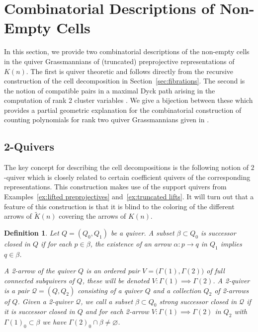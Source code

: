 \documentclass{amsart}
\newtheorem{definition}[theorem]{Definition}
\numberwithin{equation}{section}
\newcommand{\cQ}{\mathcal{Q}}
\begin{document}
\section{Combinatorial Descriptions of Non-Empty Cells}
\label{sec:combinatorics}
\noindent In this section, we provide two combinatorial descriptions of the non-empty cells in the quiver Grassmannians of (truncated) preprojective representations of $K(n)$.
The first is quiver theoretic and follows directly from the recursive construction of the cell decomposition in Section~\ref{sec:fibrations}.
The second is the notion of compatible pairs in a maximal Dyck path arising in the computation of rank 2 cluster variables \cite{llz}.
We give a bijection between these which provides a partial geometric explanation for the combinatorial construction of counting polynomials for rank two quiver Grassmannians given in \cite{rupel}.

\subsection{2-Quivers}\label{sec:2quivers}

The key concept for describing the cell decompositions is the following notion of $2$-quiver which is closely related to certain coefficient quivers of the corresponding representations.
This construction makes use of the support quivers from Examples~\ref{ex:lifted preprojectives} and~\ref{ex:truncated lifts}.
It will turn out that a feature of this construction is that it is blind to the coloring of the different arrows of $\widetilde K(n)$ covering the arrows of $K(n)$.
\begin{definition}
  Let $Q=(Q_0,Q_1)$ be a quiver.
  A subset $\beta\subset Q_0$ is \emph{successor closed in $Q$} if for each $p\in\beta$, the existence of an arrow $\alpha:p\to q$ in $Q_1$ implies $q\in\beta$.

  A \emph{2-arrow} of the quiver $Q$ is an ordered pair $V=\big(\Gamma(1),\Gamma(2)\big)$ of full connected subquivers of $Q$, these will be denoted $V:\Gamma(1)\implies\Gamma(2)$.
  A \emph{2-quiver} is a pair $\cQ=(Q,Q_2)$ consisting of a quiver $Q$ and a collection $Q_2$ of 2-arrows of $Q$.
  Given a 2-quiver $\cQ$, we call a subset $\beta\subset Q_0$ \emph{strong successor closed in $\cQ$} if it is successor closed in $Q$ and for each 2-arrow $V:\Gamma(1)\implies\Gamma(2)$ in $Q_2$ with $\Gamma(1)_0\subset\beta$ we have $\Gamma(2)_0\cap\beta\ne\varnothing$.  
\end{definition}
\end{document}

